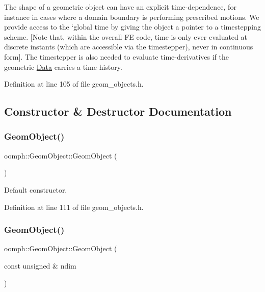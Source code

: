 The shape of a geometric object can have an explicit time-\/dependence, for instance in cases where a domain boundary is performing prescribed motions. We provide access to the `global\textquotesingle{} time by giving the object a pointer to a timestepping scheme. \mbox{[}Note that, within the overall FE code, time is only ever evaluated at discrete instants (which are accessible via the timestepper), never in continuous form\mbox{]}. The timestepper is also needed to evaluate time-\/derivatives if the geometric \hyperlink{classoomph_1_1Data}{Data} carries a time history. 

Definition at line 105 of file geom\+\_\+objects.\+h.



\subsection{Constructor \& Destructor Documentation}
\mbox{\label{classoomph_1_1GeomObject_aff5bdabab387795b74ea1df0ab4ef1a6}} 
\subsubsection{\texorpdfstring{Geom\+Object()}{GeomObject()}\hspace{0.1cm}{\footnotesize\ttfamily [1/5]}}
{\footnotesize\ttfamily oomph\+::\+Geom\+Object\+::\+Geom\+Object (\begin{DoxyParamCaption}{ }\end{DoxyParamCaption})\hspace{0.3cm}{\ttfamily [inline]}}



Default constructor. 



Definition at line 111 of file geom\+\_\+objects.\+h.

\mbox{\label{classoomph_1_1GeomObject_a56cd9cb7bb39ff2c30fb56039be83d31}} 
\subsubsection{\texorpdfstring{Geom\+Object()}{GeomObject()}\hspace{0.1cm}{\footnotesize\ttfamily [2/5]}}
{\footnotesize\ttfamily oomph\+::\+Geom\+Object\+::\+Geom\+Object (\begin{DoxyParamCaption}\item[{const unsigned \&}]{ndim }\end{DoxyParamCaption})\hspace{0.3cm}{\ttfamily [inline]}}



